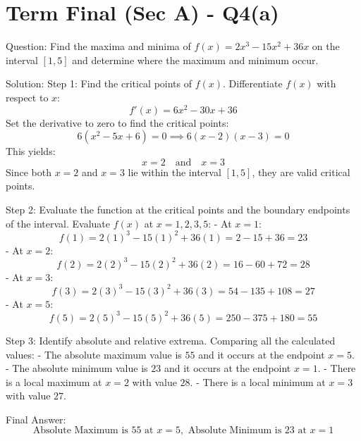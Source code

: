 \documentclass{article}
\begin{document}
\section*{Term Final (Sec A) - Q4(a)}
Question:
Find the maxima and minima of $f(x) = 2x^3 - 15x^2 + 36x$ on the interval $[1, 5]$ and determine where the maximum and minimum occur.

Solution:
Step 1: Find the critical points of $f(x)$.
Differentiate $f(x)$ with respect to $x$:
\[
f'(x) = 6x^2 - 30x + 36
\]
Set the derivative to zero to find the critical points:
\[
6(x^2 - 5x + 6) = 0 \implies 6(x-2)(x-3) = 0
\]
This yields:
\[
x = 2 \quad \text{and} \quad x = 3
\]
Since both $x = 2$ and $x = 3$ lie within the interval $[1, 5]$, they are valid critical points.

Step 2: Evaluate the function at the critical points and the boundary endpoints of the interval.
Evaluate $f(x)$ at $x = 1, 2, 3, 5$:
- At $x = 1$:
  \[
  f(1) = 2(1)^3 - 15(1)^2 + 36(1) = 2 - 15 + 36 = 23
  \]
- At $x = 2$:
  \[
  f(2) = 2(2)^3 - 15(2)^2 + 36(2) = 16 - 60 + 72 = 28
  \]
- At $x = 3$:
  \[
  f(3) = 2(3)^3 - 15(3)^2 + 36(3) = 54 - 135 + 108 = 27
  \]
- At $x = 5$:
  \[
  f(5) = 2(5)^3 - 15(5)^2 + 36(5) = 250 - 375 + 180 = 55
  \]

Step 3: Identify absolute and relative extrema.
Comparing all the calculated values:
- The absolute maximum value is $55$ and it occurs at the endpoint $x = 5$.
- The absolute minimum value is $23$ and it occurs at the endpoint $x = 1$.
- There is a local maximum at $x = 2$ with value $28$.
- There is a local minimum at $x = 3$ with value $27$.

Final Answer:
\[
\boxed{\text{Absolute Maximum is 55 at } x = 5, \text{ Absolute Minimum is 23 at } x = 1}
\]

\end{document}
